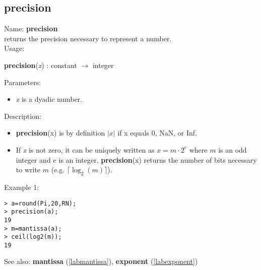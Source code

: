 \subsection{precision}
\label{labprecision}
\noindent Name: \textbf{precision}\\
returns the precision necessary to represent a number.\\
\noindent Usage: 
\begin{center}
\textbf{precision}(\emph{x}) : \textsf{constant} $\rightarrow$ \textsf{integer}
\end{center}
Parameters: 
\begin{itemize}
\item \emph{x} is a dyadic number.
\end{itemize}
\noindent Description: \begin{itemize}

\item \textbf{precision}(x) is by definition $\vert x \vert$ if x equals 0, NaN, or Inf.

\item If \emph{x} is not zero, it can be uniquely written as $x = m \cdot 2^e$ where
   $m$ is an odd integer and $e$ is an integer. \textbf{precision}(x) returns the number
   of bits necessary to write $m$ (e.g. $\lceil \log_2(m) \rceil$).
\end{itemize}
\noindent Example 1: 
\begin{center}\begin{minipage}{15cm}\begin{Verbatim}[frame=single]
> a=round(Pi,20,RN);
> precision(a);
19
> m=mantissa(a);
> ceil(log2(m));
19
\end{Verbatim}
\end{minipage}\end{center}
See also: \textbf{mantissa} (\ref{labmantissa}), \textbf{exponent} (\ref{labexponent})
